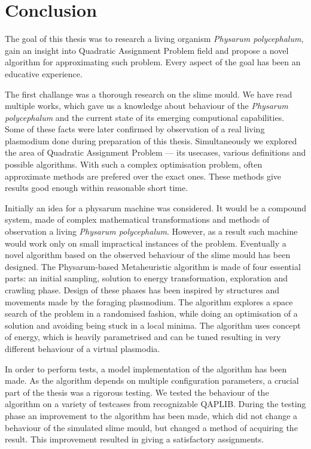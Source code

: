 \chapter{Conclusion}
\label{chapter:conclusion}

The goal of this thesis was to research a living organism \textit{Physarum polycephalum}, gain an insight into Quadratic Assignment Problem field and propose a novel algorithm for approximating such problem. Every aspect of the goal has been an educative experience.

The first challange was a thorough research on the slime mould. We have read multiple works, which gave us a knowledge about behaviour of the \textit{Physarum polycephalum} and the current state of its emerging computional capabilities. Some of these facts were later confirmed by observation of a real living plasmodium done during preparation of this thesis. Simultaneously we explored the area of Quadratic Assignment Problem --- its usecases, various definitions and possible algorithms. With such a complex optimisation problem, often approximate methods are prefered over the exact ones. These methods give results good enough within reasonable short time.

Initially an idea for a physarum machine was considered. It would be a compound system, made of complex mathematical transformations and methods of observation a living \textit{Physarum polycephalum}. However, as a result such machine would work only on small impractical instances of the problem. Eventually a novel algorithm based on the observed behaviour of the slime mould has been designed. The Physarum-based Metaheuristic algorithm is made of four essential parts: an initial sampling, solution to energy transformation, exploration and crawling phase. Design of these phases has been inspired by structures and movements made by the foraging plasmodium. The algorithm explores a space search of the problem in a randomised fashion, while doing an optimisation of a solution and avoiding being stuck in a local minima. The algorithm uses concept of energy, which is heavily parametrised and can be tuned resulting in very different behaviour of a virtual plasmodia.

In order to perform tests, a model implementation of the algorithm has been made. As the algorithm depends on multiple configuration parameters, a crucial part of the thesis was a rigorous testing. We tested the behaviour of the algorithm on a variety of testcases from recognizable QAPLIB. During the testing phase an improvement to the algorithm has been made, which did not change a behaviour of the simulated slime mould, but changed a method of acquiring the result. This improvement resulted in giving a satisfactory assignments.

